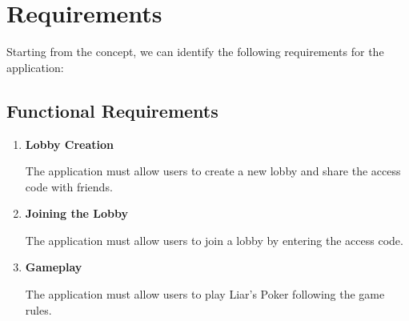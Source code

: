 \documentclass{scrartcl}
\begin{document}

\section{Requirements}\label{requirements}
Starting from the concept, we can identify the following requirements for the application:
\subsection{Functional Requirements}\label{functional-requirements}
\begin{enumerate}
  \item \textbf{Lobby Creation}\par
  The application must allow users to create a new lobby and share the access code with friends.
  \item \textbf{Joining the Lobby}\par
  The application must allow users to join a lobby by entering the access code.
  \item \textbf{Gameplay}\par
  The application must allow users to play Liar's Poker following the game rules.
\end{enumerate}
\end{document}
